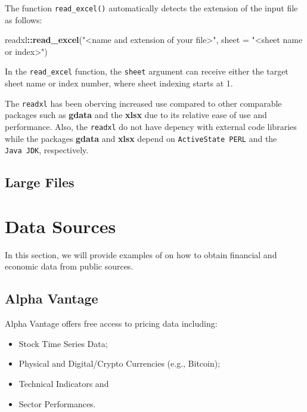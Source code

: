 \documentclass[]{book}
\newenvironment{Shaded}{\begin{snugshade}}{\end{snugshade}}
\newcommand{\KeywordTok}[1]{\textcolor[rgb]{0.13,0.29,0.53}{\textbf{#1}}}
\newcommand{\DataTypeTok}[1]{\textcolor[rgb]{0.13,0.29,0.53}{#1}}
\newcommand{\StringTok}[1]{\textcolor[rgb]{0.31,0.60,0.02}{#1}}
\newcommand{\OperatorTok}[1]{\textcolor[rgb]{0.81,0.36,0.00}{\textbf{#1}}}
\newcommand{\NormalTok}[1]{#1}
\providecommand{\tightlist}{%
  \setlength{\itemsep}{0pt}\setlength{\parskip}{0pt}}
\begin{document}
The function \texttt{read\_excel()} automatically detects the extension
of the input file as follows:

\begin{Shaded}
\begin{Highlighting}[]
\NormalTok{readxl}\OperatorTok{::}\KeywordTok{read_excel}\NormalTok{(}\StringTok{"<name and extension of your file>"}\NormalTok{, }\DataTypeTok{sheet =} \StringTok{"<sheet name or index>"}\NormalTok{)}
\end{Highlighting}
\end{Shaded}

In the \texttt{read\_excel} function, the \texttt{sheet} argument can
receive either the target sheet name or index number, where sheet
indexing starts at 1.

The \texttt{readxl} has been oberving increased use compared to other
comparable packages such as \textbf{gdata} and the \textbf{xlsx} due to
its relative ease of use and performance. Also, the \texttt{readxl} do
not have depency with external code libraries while the packages
\textbf{gdata} and \textbf{xlsx} depend on \texttt{ActiveState\ PERL}
and the \texttt{Java\ JDK}, respectively.

\subsection{Large Files}\label{large-files}

\section{Data Sources}\label{data-sources}

In this section, we will provide examples of on how to obtain financial
and economic data from public sources.

\subsection{Alpha Vantage}\label{alpha-vantage}

Alpha Vantage offers free access to pricing data including:

\begin{itemize}
\tightlist
\item
  Stock Time Series Data;
\item
  Physical and Digital/Crypto Currencies (e.g., Bitcoin);
\item
  Technical Indicators and
\item
  Sector Performances.
\end{itemize}
\end{document}
